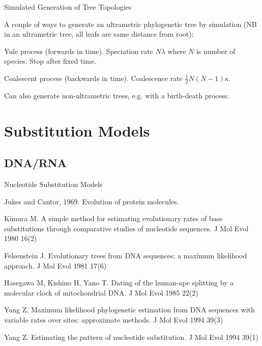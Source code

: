 \documentclass{beamer}
\begin{document}
\begin{frame}{Simulated Generation of Tree Topologies}

\itemb
\item A couple of ways to generate an ultrametric phylogenetic tree by simulation (NB in an ultrametric tree, all leafs are same distance from root):
 \itemb
 \item Yule process (forwards in time). Speciation rate $N\lambda$ where $N$ is number of species. Stop after fixed time.
 \item Coalescent process (backwards in time). Coalescence rate $\frac{1}{2} N(N-1) \kappa$.
 \iteme
\item Can also generate non-ultrametric trees, e.g. with a birth-death process.
\iteme

\end{frame}

\section{Substitution Models}

\subsection{DNA/RNA}

\begin{frame}{Nucleotide Substitution Models}

\enumb
\item Jukes and Cantor, 1969. Evolution of protein molecules. %
\item Kimura M.  A simple method for estimating evolutionary rates of base substitutions through comparative studies of nucleotide sequences.  J Mol Evol 1980 16(2)%
\item Felsenstein J.  Evolutionary trees from DNA sequences: a maximum likelihood approach.  J Mol Evol 1981 17(6)%
\item Hasegawa M, Kishino H, Yano T.  Dating of the human-ape splitting by a molecular clock of mitochondrial DNA.  J Mol Evol 1985 22(2)%
\item Yang Z.  Maximum likelihood phylogenetic estimation from DNA sequences with variable rates over sites: approximate methods.  J Mol Evol 1994 39(3)%
\item Yang Z.  Estimating the pattern of nucleotide substitution.  J Mol Evol 1994 39(1)%
\enume

\end{frame}
\end{document}
